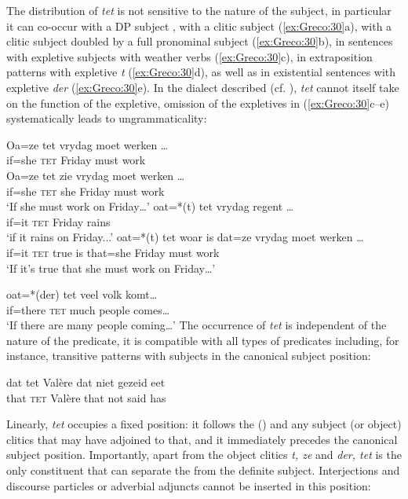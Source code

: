 \documentclass[output=paper]{LSP/langsci}
\begin{document}
The distribution of \textit{tet} is not sensitive to the nature of the subject, in particular it can co-occur with a DP subject , with a clitic subject (\ref{ex:Greco:30}a), with a clitic subject doubled by a full pronominal subject (\ref{ex:Greco:30}b), in sentences with expletive subjects with weather verbs (\ref{ex:Greco:30}c), in extraposition patterns with expletive \textit{t} (\ref{ex:Greco:30}d), as well as in existential sentences with expletive \textit{der} (\ref{ex:Greco:30}e). In the dialect described (cf. \citealt{DeVogelaerEtAl2008}), \textit{tet} cannot itself take on the function of the expletive, omission of the expletives in (\ref{ex:Greco:30}c--e) systematically leads to ungrammaticality:

\ea%
    \label{ex:Greco:30}
    \ea \gll Oa=ze   tet   vrydag   moet werken …\\
    	    if=she   \textsc{tet}   Friday   must work\\
    \ex \gll Oa=ze   tet zie     vrydag moet werken …\\
    	    if=she   \textsc{tet} she   Friday must work\\
    	\glt ‘If she must work on Friday…’
    \ex \gll oat=*(t)  tet   vrydag regent …\\
    	    if=it     \textsc{tet}  Friday rains\\
    	\glt `if it rains on Friday...’
    \ex \gll oat=*(t)   tet   woar   is   dat=ze   vrydag  moet werken …\\
             if=it     \textsc{tet}  true   is   that=she   Friday   must work\\
        \glt ‘If it’s true that she must work on Friday…’

    \ex \gll oat=*(der)   tet   veel volk     komt…\\
    	     if=there   \textsc{tet}  much people   comes…\\
    	\glt ‘If there are many people coming…’
    \z
\z
The occurrence of \textit{tet} is independent of the nature of the predicate, it is compatible with all types of predicates including, for instance, transitive patterns with subjects in the canonical subject position:

\ea%
    \label{ex:Greco:31}
    \gll dat   tet   Valère   dat   niet   gezeid   eet\\
         that   \textsc{tet}   Valère     that   not   said     has\\
\z

Linearly, \textit{tet} occupies a fixed position: it follows the ()  and any subject (or object) clitics that may have adjoined to that, and it immediately precedes the canonical subject position. Importantly, apart from the object clitics \textit{t, ze} and \textit{der, tet}  is the only constituent that can separate the  from the definite subject. Interjections and discourse particles  or adverbial adjuncts cannot be inserted in this position:
\end{document}
